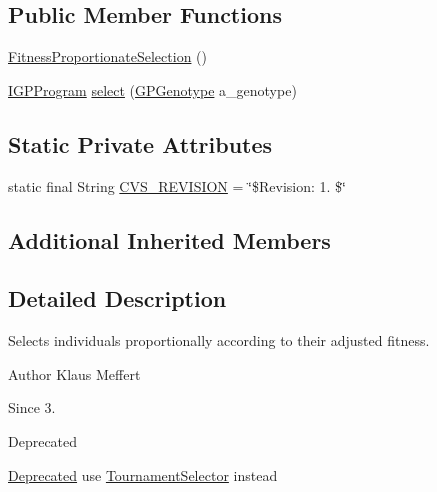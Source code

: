 \subsection*{Public Member Functions}
\begin{DoxyCompactItemize}
\item 
\hyperlink{classorg_1_1jgap_1_1gp_1_1impl_1_1_fitness_proportionate_selection_a5cfefa1bcebb47ce5566027a3b7c90fb}{Fitness\-Proportionate\-Selection} ()
\item 
\hyperlink{interfaceorg_1_1jgap_1_1gp_1_1_i_g_p_program}{I\-G\-P\-Program} \hyperlink{classorg_1_1jgap_1_1gp_1_1impl_1_1_fitness_proportionate_selection_a1bba66dc3595d954f39bd4121bc1fa7f}{select} (\hyperlink{classorg_1_1jgap_1_1gp_1_1impl_1_1_g_p_genotype}{G\-P\-Genotype} a\-\_\-genotype)
\end{DoxyCompactItemize}
\subsection*{Static Private Attributes}
\begin{DoxyCompactItemize}
\item 
static final String \hyperlink{classorg_1_1jgap_1_1gp_1_1impl_1_1_fitness_proportionate_selection_a388157e7a6ba1be832e68efb5c4f5b09}{C\-V\-S\-\_\-\-R\-E\-V\-I\-S\-I\-O\-N} = \char`\"{}\$Revision\-: 1. \$\char`\"{}
\end{DoxyCompactItemize}
\subsection*{Additional Inherited Members}


\subsection{Detailed Description}
Selects individuals proportionally according to their adjusted fitness.

\begin{DoxyAuthor}{Author}
Klaus Meffert 
\end{DoxyAuthor}
\begin{DoxySince}{Since}
3. 
\end{DoxySince}
\begin{DoxyRefDesc}{Deprecated}
\item[\hyperlink{deprecated__deprecated000009}{Deprecated}]use \hyperlink{classorg_1_1jgap_1_1gp_1_1impl_1_1_tournament_selector}{Tournament\-Selector} instead \end{DoxyRefDesc}


